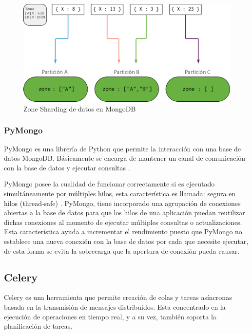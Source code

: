 \begin{itemize}
\begin{figure}[H]
	\centering
		\includegraphics[width=.9\textwidth]{figures/zone_sharding}
	\caption{Zone Sharding de datos en MongoDB}
	\label{fig:zone_sharding}
\end{figure}

\end{itemize}

\subsubsection{PyMongo}

PyMongo es una librería  de Python que permite la interacción con una base de datos MongoDB.
Básicamente se encarga de mantener un canal de comunicación con la base de datos
y ejecutar consultas \cite{17}.

PyMongo posee la cualidad de funcionar correctamente si es ejecutado
simultáneamente por múltiples hilos, esta característica es llamada: segura en hilos
(thread-safe) \cite{18}.
PyMongo, tiene incorporado una agrupación de conexiones abiertas a
la base de datos para que los hilos de una aplicación puedan reutilizar dichas
conexiones al momento de ejecutar múltiples consultas o actualizaciones. Esta
característica ayuda a incrementar el rendimiento puesto que PyMongo no establece
una nueva conexión con la base de datos por cada que necesite ejecutar, de esta forma
se evita la sobrecarga que la apertura de conexión pueda causar.

\subsection{Celery}

Celery es una herramienta que permite creación de colas y tareas asíncronas basada en la transmisión de mensajes distribuidos.
Esta concentrado en la ejecución de operaciones en tiempo real, y a su vez, también soporta la planificación de tareas.


